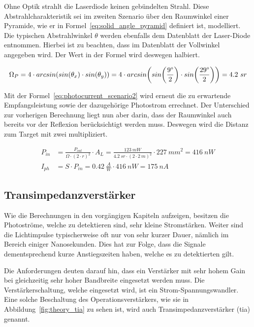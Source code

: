Ohne Optik strahlt die Laserdiode keinen gebündelten Strahl. Diese Abstrahlcharakteristik sei im zweiten Szenario über
den Raumwinkel einer Pyramide, wie er in Formel~\ref{eq:solid_angle_pyramid} definiert ist, modelliert. Die typischen
Abstrahlwinkel $\theta$ werden ebenfalls dem Datenblatt der Laser-Diode entnommen. Hierbei ist zu beachten, dass im
Datenblatt der Vollwinkel angegeben wird. Der Wert in der Formel wird deswegen halbiert.

\begin{equation}\label{eq:solid_angle_pyramid}
    \Omega_{P} = 4 \cdot arcsin(sin(\theta_x) \cdot sin(\theta_y)) =  4 \cdot arcsin \parenth*{sin \parenth*{\frac{9\degree}{2}} \cdot sin \parenth*{\frac{29\degree}{2}}} = 4.2~sr
\end{equation}

Mit der Formel~\ref{eq:photocurrent_scenario2} wird erneut die zu erwartende Empfangsleistung sowie der dazugehörige
Photostrom errechnet. Der Unterschied zur vorherigen Berechnung liegt nun aber darin, dass der Raumwinkel auch bereits
vor der Reflexion berücksichtigt werden muss. Deswegen wird die Distanz zum Target mit zwei multipliziert.

\begin{equation}\label{eq:photocurrent_scenario2}
    \begin{split}
        P_{in} &= \frac{P_{out}}{\Omega \cdot (2 \cdot r)^2} \cdot A_{L} = \frac{123~mW}{4.2~sr \cdot (2 \cdot 2~m)^2} \cdot 227~mm^2 = 416~nW\\
        I_{ph} &= S \cdot P_{in} = 0.42~\frac{A}{W} \cdot 416~nW = 175~nA
    \end{split}
\end{equation}

\pagebreak

\subsection{Transimpedanzverstärker}

Wie die Berechnungen in den vorgängigen Kapiteln aufzeigen, besitzen die Photoströme, welche zu detektieren sind, sehr kleine
Stromstärken. Weiter sind die Lichtimpulse typischerweise oft nur von sehr kurzer Dauer, nämlich im Bereich einiger Nanosekunden.
Dies hat zur Folge, dass die Signale dementsprechend kurze Anstiegszeiten haben, welche es zu detektierten gilt.

Die Anforderungen deuten darauf hin, dass ein Verstärker mit sehr hohem Gain bei gleichzeitig sehr hoher Bandbreite eingesetzt werden muss.
Die Verstärkerschaltung, welche eingesetzt wird, ist ein Strom-Spannungswandler. Eine solche Beschaltung des Operationsverstärkers,
wie sie in Abbildung~\ref{fig:theory_tia} zu sehen ist, wird auch Transimpedanzverstärker (\acrshort{tia}) genannt.

